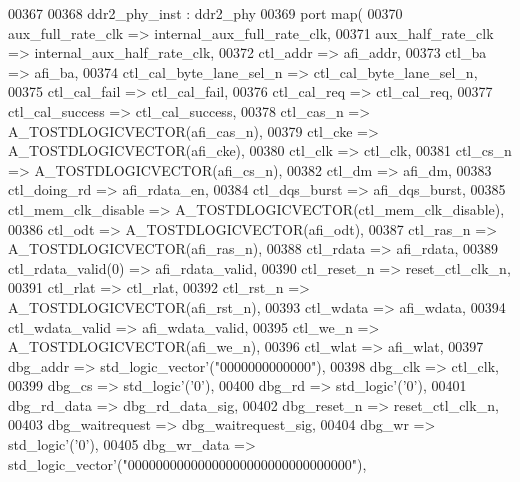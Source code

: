 \begin{DoxyCode}
00367 
00368   ddr2\_phy\_inst : ddr2_phy
00369     \textcolor{keywordflow}{port} \textcolor{keywordflow}{map}(
00370             aux_full_rate_clk => internal_aux_full_rate_clk,
00371             aux_half_rate_clk => internal_aux_half_rate_clk,
00372             ctl_addr => afi_addr,
00373             ctl_ba => afi_ba,
00374             ctl_cal_byte_lane_sel_n => ctl_cal_byte_lane_sel_n,
00375             ctl_cal_fail => ctl_cal_fail,
00376             ctl_cal_req => ctl_cal_req,
00377             ctl_cal_success => ctl_cal_success,
00378             ctl_cas_n => A\_TOSTDLOGICVECTOR\textcolor{vhdlchar}{(}afi_cas_n\textcolor{vhdlchar}{)},
00379             ctl_cke => A\_TOSTDLOGICVECTOR\textcolor{vhdlchar}{(}afi_cke\textcolor{vhdlchar}{)},
00380             ctl_clk => ctl_clk,
00381             ctl_cs_n => A\_TOSTDLOGICVECTOR\textcolor{vhdlchar}{(}afi_cs_n\textcolor{vhdlchar}{)},
00382             ctl_dm => afi_dm,
00383             ctl_doing_rd => afi_rdata_en,
00384             ctl_dqs_burst => afi_dqs_burst,
00385             ctl_mem_clk_disable => A\_TOSTDLOGICVECTOR\textcolor{vhdlchar}{(}ctl_mem_clk_disable\textcolor{vhdlchar}{)},
00386             ctl_odt => A\_TOSTDLOGICVECTOR\textcolor{vhdlchar}{(}afi_odt\textcolor{vhdlchar}{)},
00387             ctl_ras_n => A\_TOSTDLOGICVECTOR\textcolor{vhdlchar}{(}afi_ras_n\textcolor{vhdlchar}{)},
00388             ctl_rdata => afi_rdata,
00389             ctl\_rdata\_valid\textcolor{vhdlchar}{(}\textcolor{vhdllogic}{0}\textcolor{vhdlchar}{)} => afi_rdata_valid,
00390             ctl_reset_n => reset_ctl_clk_n,
00391             ctl_rlat => ctl_rlat,
00392             ctl_rst_n => A\_TOSTDLOGICVECTOR\textcolor{vhdlchar}{(}afi_rst_n\textcolor{vhdlchar}{)},
00393             ctl_wdata => afi_wdata,
00394             ctl_wdata_valid => afi_wdata_valid,
00395             ctl_we_n => A\_TOSTDLOGICVECTOR\textcolor{vhdlchar}{(}afi_we_n\textcolor{vhdlchar}{)},
00396             ctl_wlat => afi_wlat,
00397             dbg_addr => std\_logic\_vector'\textcolor{vhdlchar}{(}"0000000000000"\textcolor{vhdlchar}{)},
00398             dbg_clk => ctl_clk,
00399             dbg_cs => std\_logic'\textcolor{vhdlchar}{(}'0'\textcolor{vhdlchar}{)},
00400             dbg_rd => std\_logic'\textcolor{vhdlchar}{(}'0'\textcolor{vhdlchar}{)},
00401             dbg_rd_data => dbg_rd_data_sig,
00402             dbg_reset_n => reset_ctl_clk_n,
00403             dbg_waitrequest => dbg_waitrequest_sig,
00404             dbg_wr => std\_logic'\textcolor{vhdlchar}{(}'0'\textcolor{vhdlchar}{)},
00405             dbg_wr_data => std\_logic\_vector'\textcolor{vhdlchar}{(}"00000000000000000000000000000000"\textcolor{vhdlchar}{)},

\end{DoxyCode}

